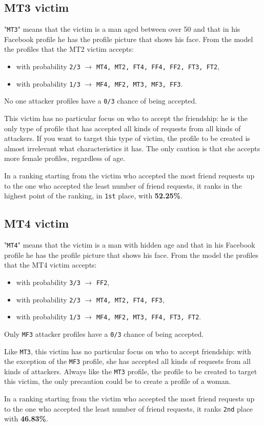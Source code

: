 \subsection*{MT3 victim}
"\texttt{MT3}" means that the victim is a man aged between over 50 and that in his Facebook profile he has the profile picture that shows his face.
From the model the profiles that the MT2 victim accepts:
\begin{itemize}
	\item with probability \texttt{2/3} $\rightarrow$ \texttt{MT4, MT2, FT4, FF4, FF2, FT3, FT2},
	\item with probability \texttt{1/3} $\rightarrow$ \texttt{MF4, MF2, MT3, MF3, FF3}.
\end{itemize} 
No one attacker profiles have a \texttt{0/3} chance of being accepted. \par \noindent
This victim has no particular focus on who to accept the friendship: he is the only type of profile that has accepted all kinds of requests from all kinds of attackers. If you want to target this type of victim, the profile to be created is almost irrelevant what characteristics it has. The only caution is that she accepts more female profiles, regardless of age.
\par \noindent In a ranking starting from the victim who accepted the most friend requests up to the one who accepted the least number of friend requests, it ranks in the highest point of the ranking, in \texttt{1st} place, with \textbf{52.25\%}.


\subsection*{MT4 victim}
"\texttt{MT4}" means that the victim is a man with hidden age and that in his Facebook profile he has the profile picture that shows his face.
From the model the profiles that the MT4 victim accepts:
\begin{itemize}
	\item with probability \texttt{3/3} $\rightarrow$ \texttt{FF2},
	\item with probability \texttt{2/3} $\rightarrow$ \texttt{MT4, MT2, FT4, FF3},
	\item with probability \texttt{1/3} $\rightarrow$ \texttt{MF4, MF2, MT3, FF4, FT3, FT2}.
\end{itemize} 
Only \texttt{MF3} attacker profiles have a \texttt{0/3} chance of being accepted. \par \noindent
Like \texttt{MT3}, this victim has no particular focus on who to accept friendship: with the exception of the \texttt{MF3} profile, she has accepted all kinds of requests from all kinds of attackers. Always like the \texttt{MT3} profile, the profile to be created to target this victim, the only precaution could be to create a profile of a woman.
\par \noindent In a ranking starting from the victim who accepted the most friend requests up to the one who accepted the least number of friend requests, it ranks \texttt{2nd} place with \textbf{46.83\%}.

